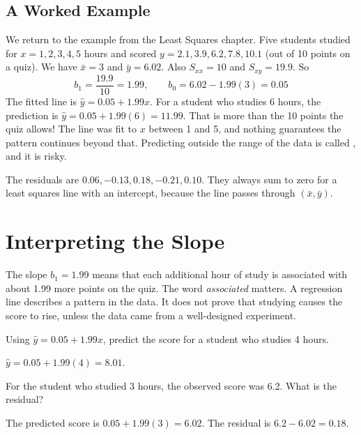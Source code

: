 \subsection{A Worked Example}
We return to the example from the Least Squares chapter. Five students studied for $x = 1, 2, 3, 4, 5$ hours and scored
$y = 2.1, 3.9, 6.2, 7.8, 10.1$ (out of 10 points on a quiz).
We have $\bar{x} = 3$ and $\bar{y} = 6.02$. Also $S_{xx} = 10$ and
$S_{xy} = 19.9$. So
$$b_1 = \frac{19.9}{10} = 1.99, \qquad b_0 = 6.02 - 1.99(3) = 0.05$$
The fitted line is $\hat{y} = 0.05 + 1.99x$. For a student who studies 6 hours,
the prediction is $\hat{y} = 0.05 + 1.99(6) = 11.99$. That is more than the
10 points the quiz allows! The line was fit to $x$ between 1 and 5, and nothing
guarantees the pattern continues beyond that. Predicting outside the range of
the data is called , and it is risky.

The residuals are $0.06, -0.13, 0.18, -0.21, 0.10$. They always sum to zero for
a least squares line with an intercept, because the line passes through
$(\bar{x}, \bar{y})$.

\section{Interpreting the Slope}
The slope $b_1 = 1.99$ means that each additional hour of study is associated
with about 1.99 more points on the quiz. The word \emph{associated} matters. A
regression line describes a pattern in the data. It does not prove that studying
causes the score to rise, unless the data came from a well-designed experiment.

\begin{Exercise}[label=slr1, title=Predict a value]
Using $\hat{y} = 0.05 + 1.99x$, predict the score for a student who studies
4 hours.
\end{Exercise}
\begin{Answer}[ref=slr1]
$\hat{y} = 0.05 + 1.99(4) = 8.01$.
\end{Answer}

\begin{Exercise}[label=slr2, title=Find a residual]
For the student who studied 3 hours, the observed score was 6.2. What is the residual?
\end{Exercise}
\begin{Answer}[ref=slr2]
The predicted score is $0.05 + 1.99(3) = 6.02$. The residual is $6.2 - 6.02 = 0.18$.
\end{Answer}

